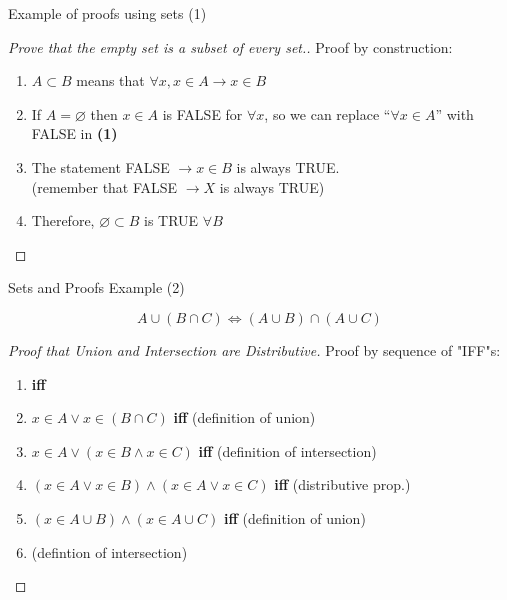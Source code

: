 \begin{frame}[t]{Example of proofs using sets (1)}

  \begin{proof}[Prove that the empty set is a subset of every set.]
    Proof by construction:

  \begin{enumerate}

  \item $A \subset B$ means that $\forall x, x \in A \rightarrow x \in B$\bigskip

  \item If $A = \varnothing$ then $x \in A$ is FALSE for $\forall x$, so we can replace ``$\forall x \in A$'' with FALSE in {\bf (1)}\bigskip

\item The statement FALSE $\rightarrow x \in B$ is always TRUE.\\ \hfill (remember that FALSE $\rightarrow X$ is always TRUE)\bigskip

  \item Therefore, $\varnothing \subset B$ is TRUE $\forall B$
  \end{enumerate}
  \end{proof}
\end{frame}


\begin{frame}[t]{Sets and Proofs Example (2)}

  \begin{equation*}
    A \cup (B \cap C) \iff (A \cup B) \cap (A \cup C)
  \end{equation*}

  \begin{proof}[Proof that Union and Intersection are Distributive]
    Proof by sequence of "IFF"s:
    \begin{enumerate}
    \item {} {\bf iff}
    \item $x \in A \lor x \in (B \cap C)$ {\bf iff} \hfill (definition of union)
    \item $x \in A \lor (x \in B \land x \in C)$ {\bf iff} \hfill
      (definition of intersection)
    \item $(x \in A \lor x \in B) \land (x\in A \lor x \in C)$ {\bf
      iff} \hfill (distributive prop.)
    \item $(x \in A\cup B) \land (x \in A\cup C)$ {\bf iff}\hfill
      (definition of union)
    \item {}  \hfill
      (defintion of intersection)

    \end{enumerate}
  \end{proof}
\end{frame}

